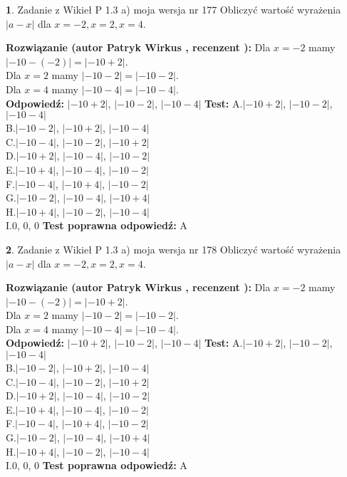 \documentclass[12pt, a4paper]{article}
\theoremstyle{definition} %
\newtheorem{zad}{}
\newcommand{\zadStart}[1]{\begin{zad}#1\newline}
\newcommand{\zadStop}{\end{zad}}
\newcommand{\rozwStart}[2]{\noindent \textbf{Rozwiązanie (autor #1 , recenzent #2): }\newline}
\newcommand{\rozwStop}{\newline}
\newcommand{\odpStart}{\noindent \textbf{Odpowiedź:}\newline}
\newcommand{\odpStop}{\newline}
\newcommand{\testStart}{\noindent \textbf{Test:}\newline}
\newcommand{\testStop}{\newline}
\newcommand{\kluczStart}{\noindent \textbf{Test poprawna odpowiedź:}\newline}
\newcommand{\kluczStop}{\newline}
\begin{document}
\zadStart{Zadanie z Wikieł P 1.3 a) moja wersja nr 177}
Obliczyć wartość wyrażenia $|a - x|$ dla $x=-2,x=2,x=4$.
\zadStop
\rozwStart{Patryk Wirkus}{}
Dla $x = -2$ mamy $|-10 - (-2)| = |-10 + 2|$.\\
Dla $x = 2$ mamy $|-10 - 2| = |-10 - 2|$.\\
Dla $x = 4$ mamy $|-10 - 4| = |-10 - 4|$.\\
\rozwStop
\odpStart
$|-10 + 2|$, $|-10 - 2|$, $|-10 - 4|$
\odpStop
\testStart
A.$|-10 + 2|$, $|-10 - 2|$, $|-10 - 4|$\\
B.$|-10 - 2|$, $|-10 + 2|$, $|-10 - 4|$\\
C.$|-10 - 4|$, $|-10 - 2|$, $|-10 + 2|$\\
D.$|-10 + 2|$, $|-10 - 4|$, $|-10 - 2|$\\
E.$|-10 + 4|$, $|-10 - 4|$, $|-10 - 2|$\\
F.$|-10 - 4|$, $|-10 + 4|$, $|-10 - 2|$\\
G.$|-10 - 2|$, $|-10 - 4|$, $|-10 + 4|$\\
H.$|-10 + 4|$, $|-10 - 2|$, $|-10 - 4|$\\
I.$0$, $0$, $0$
\testStop
\kluczStart
A
\kluczStop



\zadStart{Zadanie z Wikieł P 1.3 a) moja wersja nr 178}
Obliczyć wartość wyrażenia $|a - x|$ dla $x=-2,x=2,x=4$.
\zadStop
\rozwStart{Patryk Wirkus}{}
Dla $x = -2$ mamy $|-10 - (-2)| = |-10 + 2|$.\\
Dla $x = 2$ mamy $|-10 - 2| = |-10 - 2|$.\\
Dla $x = 4$ mamy $|-10 - 4| = |-10 - 4|$.\\
\rozwStop
\odpStart
$|-10 + 2|$, $|-10 - 2|$, $|-10 - 4|$
\odpStop
\testStart
A.$|-10 + 2|$, $|-10 - 2|$, $|-10 - 4|$\\
B.$|-10 - 2|$, $|-10 + 2|$, $|-10 - 4|$\\
C.$|-10 - 4|$, $|-10 - 2|$, $|-10 + 2|$\\
D.$|-10 + 2|$, $|-10 - 4|$, $|-10 - 2|$\\
E.$|-10 + 4|$, $|-10 - 4|$, $|-10 - 2|$\\
F.$|-10 - 4|$, $|-10 + 4|$, $|-10 - 2|$\\
G.$|-10 - 2|$, $|-10 - 4|$, $|-10 + 4|$\\
H.$|-10 + 4|$, $|-10 - 2|$, $|-10 - 4|$\\
I.$0$, $0$, $0$
\testStop
\kluczStart
A
\kluczStop
\end{document}

